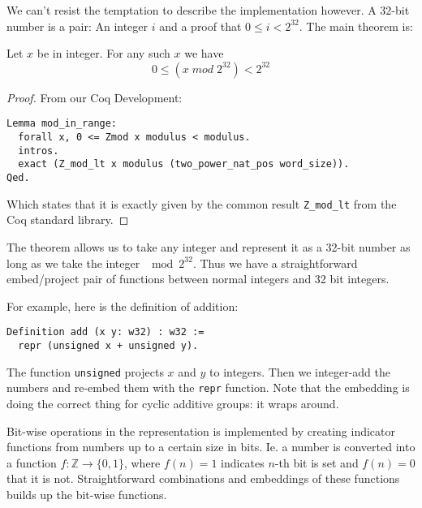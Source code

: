 We can't resist the temptation to describe the implementation however. A
32-bit number is a pair: An integer $i$ and a proof that $0 \leq i <
2^{32}$. The main theorem is:
\begin{lem}
  Let $x$ be in integer. For any such $x$ we have
  \begin{equation*}
    0 \leq (x \;mod\; 2^{32}) < 2^{32}
  \end{equation*}
\end{lem}
\begin{proof}
  From our Coq Development:
\begin{verbatim}
Lemma mod_in_range:
  forall x, 0 <= Zmod x modulus < modulus.
  intros.
  exact (Z_mod_lt x modulus (two_power_nat_pos word_size)).
Qed.
\end{verbatim}
  Which states that it is exactly given by the common result
  \texttt{Z\_mod\_lt} from the Coq standard library.
\end{proof}
The theorem allows us to take any integer and represent it as a 32-bit
number as long as we take the integer $\mod 2^{32}$. Thus we have a
straightforward embed/project pair of functions between normal
integers and 32 bit integers.

For example, here is the definition of addition:
\begin{verbatim}
Definition add (x y: w32) : w32 :=
  repr (unsigned x + unsigned y).
\end{verbatim}
The function \texttt{unsigned} projects $x$ and $y$ to integers. Then
we integer-add the numbers and re-embed them with the \texttt{repr}
function. Note that the embedding is doing the correct thing for
cyclic additive groups: it wraps around.

Bit-wise operations in the representation is implemented by creating
indicator functions from numbers up to a certain size in bits. Ie. a
number is converted into a function $f \colon \mathbb{Z} \to \{0,
1\}$, where $f(n) = 1$ indicates $n$-th bit is set and $f(n) = 0$
that it is not. Straightforward combinations and embeddings of these
functions builds up the bit-wise functions.

